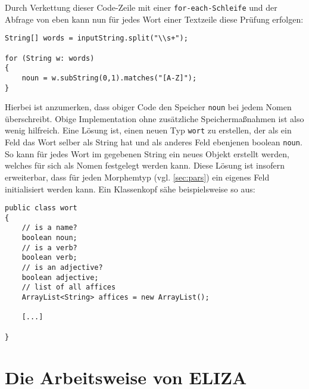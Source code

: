 \documentclass[12pt,twoside]{article}
\theoremstyle{plain}
\theoremstyle{definition}
\theoremstyle{remark}
\begin{document}
Durch Verkettung dieser Code-Zeile mit einer \texttt{for-each-Schleife} und der Abfrage von eben kann nun für jedes Wort einer Textzeile diese Prüfung erfolgen:
\begin{lstlisting}
String[] words = inputString.split("\\s+");

for (String w: words)
{
	noun = w.subString(0,1).matches("[A-Z]");
}
\end{lstlisting}
Hierbei ist anzumerken, dass obiger Code den Speicher \texttt{noun} bei jedem Nomen überschreibt.
Obige Implementation ohne zusätzliche Speichermaßnahmen ist also wenig hilfreich.
Eine Lösung ist, einen neuen Typ \texttt{wort} zu erstellen, der als ein Feld das Wort selber als String hat und als anderes Feld ebenjenen boolean \texttt{noun}.
So kann für jedes Wort im gegebenen String ein neues Objekt erstellt werden, welches für sich als Nomen festgelegt werden kann.
Diese Lösung ist insofern erweiterbar, dass für jeden Morphemtyp (vgl. \ref{sec:pars}) ein eigenes Feld initialisiert werden kann.
Ein Klassenkopf sähe beispielsweise so aus:
\begin{lstlisting}
public class wort
{
	// is a name?
	boolean noun;
	// is a verb?
	boolean verb;
	// is an adjective?
	boolean adjective;
	// list of all affices
	ArrayList<String> affices = new ArrayList();
	
	[...]

}
\end{lstlisting}
\section{Die Arbeitsweise von ELIZA}
\label{sec:eliza}
\end{document}
